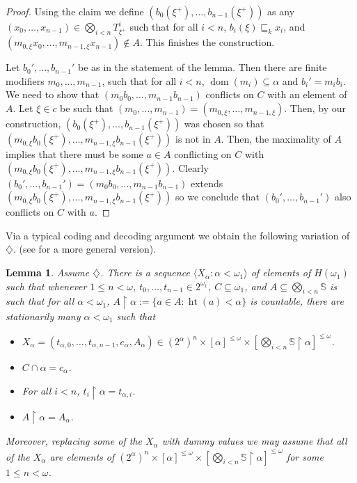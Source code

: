\documentclass[a4paper,noamsfonts]{amsart}
\newtheorem{lemma}[theorem]{Lemma}
\theoremstyle{definition}
\newcommand{\seb}{\subseteq}
\newcommand{\tleq}{\sqsubseteq}
\newcommand{\res}{\!\upharpoonright\!}
\newcommand{\tup}[1]{\langle#1\rangle}
\newcommand{\1}{\mathbf{1}}
\newcommand{\dia}{\diamondsuit}
\renewcommand{\S}{\mathbb{S}}
\DeclareMathOperator{\dom}{dom}
\DeclareMathOperator{\hht}{ht}
\begin{document}
\begin{proof}
  Using the claim we define
  $(b_{0}(\xi^{+}),\dots,b_{n-1}(\xi^{+}))$
  as any $(x_{0},\dots,x_{n-1}) \in \bigotimes_{i <n}T^{i}_{\xi^{+}}$ such that
  for all $i <n$, $b_{i}(\xi) \tleq_{k} x_{i}$, and
  $(m_{0,\xi} x_{0},\dots,m_{n-1,\xi} x_{n-1}) \notin A$. This finishes the
  construction.
  
  Let $b_{0}',\dots,b_{n-1}'$ be
  as in the statement of the lemma. Then there are finite modifiers
  $m_{0},\dots,m_{n-1}$, such that for all $i < n$, $\dom(m_{i}) \seb \alpha$
  and $b_{i}' = m_{i} b_{i}$. We need to show
  that $(m_{0}b_{0},\dots,m_{n-1}b_{n-1})$ conflicts on $C$
  with an element of $A$.
  Let $\xi \in c$ be such that
  $(m_{0},\dots,m_{n-1}) = (m_{0,\xi},\dots,m_{n-1,\xi})$. Then, by our construction,
  $(b_{0}(\xi^{+}),\dots,b_{n-1}(\xi^{+}))$ was chosen so that
  $(m_{0,\xi}b_{0}(\xi^{+}),\dots,\allowbreak m_{n-1,\xi}b_{n-1}(\xi^{+}))$ is
  not in $A$. Then, the maximality of $A$ implies that there must be
  some $a \in A$ conflicting on $C$ with
  $(m_{0,\xi}b_{0}(\xi^{+}),\dots,\allowbreak m_{n-1,\xi}b_{n-1}(\xi^{+}))$. Clearly
  $(b_{0}',\dots,b_{n-1}') = (m_{0}b_{0},\dots,m_{n-1}b_{n-1})$ extends
  $(m_{0,\xi}b_{0}(\xi^{+}),\dots,\allowbreak m_{n-1,\xi}b_{n-1}(\xi^{+}))$
  so we conclude that
  $(b_{0}',\dots,b_{n-1}')$ also conflicts on $C$ with $a$.
\end{proof}

Via a typical coding and decoding argument we obtain the following
variation of $\dia$. (see \cite{BrodskyRinotI} for a more general version).

\begin{lemma}\label{lem:diamond}
  Assume $\dia$. There
  is a sequence $\tup{X_{\alpha} : \alpha < \omega_{1}}$ of
  elements of $H(\omega_{1})$ such that
  whenever $1 \le n < \omega$, $t_{0},\dots,t_{n-1} \in 2^{\omega_{1}}$,
  $C \seb \omega_{1}$, and
  $A \seb \bigotimes_{i < n}\S$ is such that for all $\alpha < \omega_{1}$,
  $A\res \alpha := \{a \in A : \hht(a) < \alpha\}$ is countable,
  there are stationarily many $\alpha < \omega_{1}$ such that
  \begin{itemize}
    \item $X_{\alpha} = (t_{\alpha,0},\dots,t_{\alpha,n-1},c_{\alpha},A_{\alpha})
    \in (2^{\alpha})^{n}\times [\alpha]^{\le\omega}\times
    [\bigotimes_{i <n} \S\res \alpha]^{\le \omega}$.
    \item $C \cap \alpha = c_{\alpha}$.
    \item For all $i < n$, $t_{i}\res \alpha = t_{\alpha,i}$.
    \item $A \res \alpha = A_{\alpha}$.
  \end{itemize}
  Moreover, replacing some of the $X_{\alpha}$ with dummy values
  we  may assume that all of the $X_{\alpha}$ are
  elements of $(2^{\alpha})^{n}\times [\alpha]^{\le\omega}\times
    [\bigotimes_{i <n} \S\res \alpha]^{\le\omega}$
  for some $1 \le n < \omega$.
\end{lemma}
\end{document}
